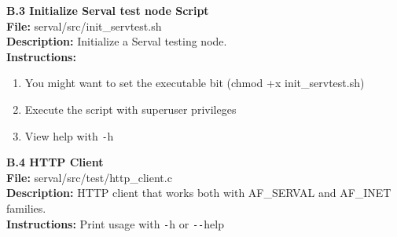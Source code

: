 \documentclass[12pt,a4paper,oneside]{article}
\begin{document}
\newpage
{}
{}
{\huge \bf \noindent B.3 Initialize Serval test node Script}\\[0.5cm]
\textbf{File:} serval/src/init\_servtest.sh\\
\textbf{Description:} Initialize a Serval testing node.\\
\textbf{Instructions: }
\begin{enumerate} \itemsep1pt \parskip0pt 
	\item You might want to set the executable bit (chmod +x init\_servtest.sh)
	\item Execute the script with superuser privileges
	\item View help with \texttt{-}h\\[0.5cm]
\end{enumerate}


\newpage
{}
{}
{\huge \bf \noindent B.4 HTTP Client}\\[0.5cm]
\textbf{File:} serval/src/test/http\_client.c\\
\textbf{Description:} HTTP client that works both with AF\_SERVAL and AF\_INET families.\\
\textbf{Instructions: } Print usage with \texttt{-}h or \texttt{{-}{-}}help\\[0.5cm]

\end{document}

